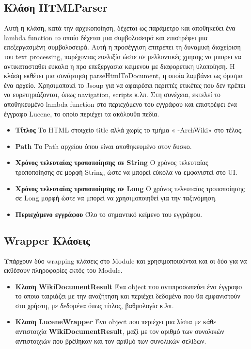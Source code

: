\documentclass[conference]{IEEEtran}
\begin{document}
{        \subsection{\textbf{Κλάση HTMLParser}}{
            Αυτή η κλάση, κατά την αρχικοποίηση, δέχεται ως παράμετρο και αποθηκεύει ένα lambda function το οποίο δέχεται μια συμβολοσειρά και επιστρέφει μια επεξεργασμένη συμβολοσειρά. Αυτή η προσέγγιση επιτρέπει τη δυναμική διαχείριση του text processing, παρέχοντας ευελιξία ώστε σε μελλοντικές χρησης να μπορει να αντικατασταθει ευκολα η προ επεξεργασια κειμενου με διαφορετικη υλοποίηση.
            Η κλάση εκθέτει μια συνάρτηση parseHtmlToDocument, η οποία λαμβάνει ως όρισμα ένα αρχείο. Χρησιμοποιεί το Jsoup για να αφαιρέσει περιττές ετικέτες που δεν πρέπει να ευρετηριάζονται, όπως navigation, scripts κ.λπ.
            Στη συνέχεια, εκτελεί το αποθηκευμένο lambda function στο περιεχόμενο του εγγράφου και επιστρέφει ένα έγγραφο Lucene, το οποίο περιέχει τα ακόλουθα πεδία.

            \begin{itemize}
                \item \textbf{Τίτλος} Το HTML στοιχείο title αλλά χωρίς το τμήμα « -ArchWiki» στο τέλος.
                \item \textbf{Path} Το Path αρχείου όπου είναι αποθηκευμένο στον δυσκο.
                \item \textbf{Χρόνος τελευταίας τροποποίησης σε String} Ο χρόνος τελευταίας τροποποίησης σε μορφή String, ώστε να μπορεί εύκολα να εμφανιστεί στο UI.
                \item \textbf{Χρόνος τελευταίας τροποποίησης σε Long} Ο χρόνος τελευταίας τροποποίησης σε Long μορφή ώστε να μπορεί να χρησιμοποιηθεί για την ταξινόμηση.
                \item \textbf{Περιεχόμενο εγγράφου} Όλο το σημαντικό κείμενο του εγγράφου.
            \end{itemize}}\label{htmlparser-class}

        \subsection{\textbf{Wrapper Κλάσεις}}{
            Υπάρχουν δύο wrapping κλάσεις στο Module και χρησιμοποιούνται και οι δύο για να εκθέσουν πληροφορίες εκτός του Module.
            \begin{itemize}
                \item \textbf{Κλαση WikiDocumentResult} Ένα object που αντιπροσωπεύει ένα έγγραφο το οποιο ταιριάζει με την αναζήτηση και περιέχει δεδομένα που θα εμφανιστούν στο χρήστη, με δεδομένα όπως τίτλος, βαθμολογία κ.λπ.
                \item \textbf{Κλαση LuceneWrapper} Ένα object που περιέχει μια λίστα με κάθε αντιστοιχία \textbf{WikiDocumentResult}, μαζί με τον αριθμό των συνολικών αντιστοιχιών που βρέθηκαν και τον αριθμό των συνολικών σελίδων.
            \end{itemize}}\label{wrapper-classes}

    }\label{sec:searchengine-module}
\end{document}
